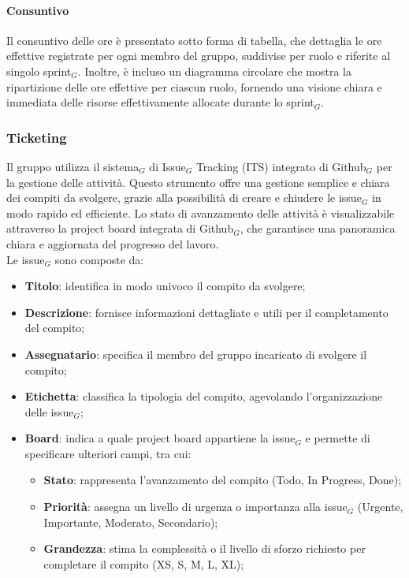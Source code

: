 \documentclass[10pt]{article}
\begin{document}
\begin{justify}
        \paragraph{Consuntivo}
        Il consuntivo delle ore è presentato sotto forma di tabella, che dettaglia le ore effettive registrate per ogni membro del gruppo, suddivise per ruolo e riferite al singolo sprint$_G$. Inoltre, è incluso un diagramma circolare che mostra la ripartizione delle ore effettive per ciascun ruolo, fornendo una visione chiara e immediata delle risorse effettivamente allocate durante lo sprint$_G$.

    \subsubsection{Ticketing}
    Il gruppo utilizza il sistema$_G$ di Issue$_G$ Tracking (ITS) integrato di Github$_G$ per la gestione delle attività. Questo strumento offre una gestione semplice e chiara dei compiti da svolgere, grazie alla possibilità di creare e chiudere le issue$_G$ in modo rapido ed efficiente. Lo stato di avanzamento delle attività è visualizzabile attraverso la project board integrata di Github$_G$, che garantisce una panoramica chiara e aggiornata del progresso del lavoro.\\
    Le issue$_G$ sono composte da:
    \begin{itemize}
        \item \textbf{Titolo}: identifica in modo univoco il compito da svolgere;
        \item \textbf{Descrizione}: fornisce informazioni dettagliate e utili per il completamento del compito;
        \item \textbf{Assegnatario}: specifica il membro del gruppo incaricato di svolgere il compito;
        \item \textbf{Etichetta}: classifica la tipologia del compito, agevolando l'organizzazione delle issue$_G$;
        \item \textbf{Board}: indica a quale project board appartiene la issue$_G$ e permette di specificare ulteriori campi, tra cui:
        \begin{itemize}
            \item \textbf{Stato}: rappresenta l'avanzamento del compito (Todo, In Progress, Done);
            \item \textbf{Priorità}: assegna un livello di urgenza o importanza alla issue$_G$ (Urgente, Importante, Moderato, Secondario);
            \item \textbf{Grandezza}: stima la complessità o il livello di sforzo richiesto per completare il compito (XS, S, M, L, XL);

\end{itemize}
\end{itemize}
\end{justify}
\end{document}
